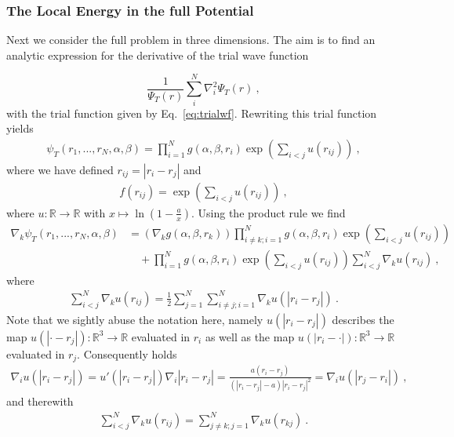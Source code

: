 \documentclass[11pt,a4paper]{article}
\numberwithin{equation}{section}
\begin{document}
\subsubsection{The Local Energy in the full Potential}
%
%
Next we consider the full problem in three dimensions.
%
The aim is to find an analytic expression for the derivative of the trial wave function

\begin{equation*}
\frac{1}{\Psi_T({r})}\sum_i^{N}\nabla_i^2\Psi_T({r})~,
\end{equation*}
with the trial function given by Eq.~\eqref{eq:trialwf}.
%
Rewriting this trial function yields
\begin{align*}
\psi_T(r_1,...,r_N,\alpha,\beta)=\prod_{i=1}^N g(\alpha,\beta,{r}_i)\exp{\left(\sum_{i<j}u(r_{ij})\right)}~,
\end{align*}
where we have defined $r_{ij}=|{r}_i-{r}_j|$ and 
\begin{align*}
f(r_{ij})= \exp{\left(\sum_{i<j}u(r_{ij})\right)}~,
\end{align*}
where $u:\mathbb{R}\to \mathbb{R}$ with $x\mapsto \ln \left(1-\frac{a}{x}\right)$.
%
Using the product rule we find
\begin{equation}
\label{eq:gradientTrailFunk}
\begin{aligned}
\nabla_k\psi_T(r_1,...,r_N,\alpha,\beta)
&=
\left(\nabla_kg(\alpha,\beta,{r}_k)\right)\prod_{i\neq k;i=1}^N g(\alpha,\beta,{r}_i)\exp{\left(\sum_{i<j}u(r_{ij})\right)}\\
&\quad +\prod_{i=1}^N g(\alpha,\beta,{r}_i)\exp{\left(\sum_{i<j}u(r_{ij})\right)}\sum_{i<j}^N\nabla_ku(r_{ij})~,
\end{aligned}
\end{equation}
where 
\begin{align*}
\sum_{i<j}^N\nabla_ku(r_{ij})
=
\frac{1}{2}\sum_{j=1}^N\sum_{i\neq j;i=1}^N\nabla_k u(|r_i-r_j|) ~.
\end{align*}
Note that we sightly abuse the notation here, namely $u(|r_i-r_j|)$ describes the map $u(|\cdot -r_j|):\mathbb{R}^3\to \mathbb{R}$ evaluated in $r_i$ as well as the map $u(|r_i -\cdot|):\mathbb{R}^3\to \mathbb{R}$ evaluated in $r_j$.
%
Consequently holds
\begin{align}
\label{eq:nablaU}
\nabla_i u(|r_i-r_j|)
=
u'(|r_i-r_j|)\nabla_i |r_i-r_j|
=
\frac{a(r_i-r_j)}{(|r_i-r_j|-a)|r_i-r_j|^2}=\nabla_i u(|r_j-r_i|)~,
\end{align} 
and therewith
\begin{align*}
\sum_{i<j}^N\nabla_ku(r_{ij})
=\sum_{j\neq k;j=1}^N\nabla_k u(r_{kj})~.
\end{align*}
\end{document}
